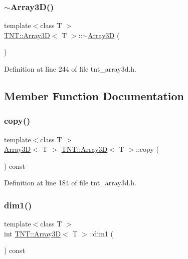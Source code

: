 \subsubsection{\texorpdfstring{$\sim$\+Array3\+D()}{~Array3D()}}
{\footnotesize\ttfamily template$<$class T $>$ \\
\hyperlink{classTNT_1_1Array3D}{T\+N\+T\+::\+Array3D}$<$ T $>$\+::$\sim$\hyperlink{classTNT_1_1Array3D}{Array3D} (\begin{DoxyParamCaption}{ }\end{DoxyParamCaption})}



Definition at line 244 of file tnt\+\_\+array3d.\+h.



\subsection{Member Function Documentation}
\mbox{\label{classTNT_1_1Array3D_a7f24fda8bf695184726a1b6d6bd31bbf}} 
\subsubsection{\texorpdfstring{copy()}{copy()}}
{\footnotesize\ttfamily template$<$class T $>$ \\
\hyperlink{classTNT_1_1Array3D}{Array3D}$<$ T $>$ \hyperlink{classTNT_1_1Array3D}{T\+N\+T\+::\+Array3D}$<$ T $>$\+::copy (\begin{DoxyParamCaption}{ }\end{DoxyParamCaption}) const}



Definition at line 184 of file tnt\+\_\+array3d.\+h.

\mbox{\label{classTNT_1_1Array3D_a5e232b8194cb0162f554702fa37ce1f6}} 
\subsubsection{\texorpdfstring{dim1()}{dim1()}}
{\footnotesize\ttfamily template$<$class T $>$ \\
int \hyperlink{classTNT_1_1Array3D}{T\+N\+T\+::\+Array3D}$<$ T $>$\+::dim1 (\begin{DoxyParamCaption}{ }\end{DoxyParamCaption}) const\hspace{0.3cm}{\ttfamily [inline]}}




